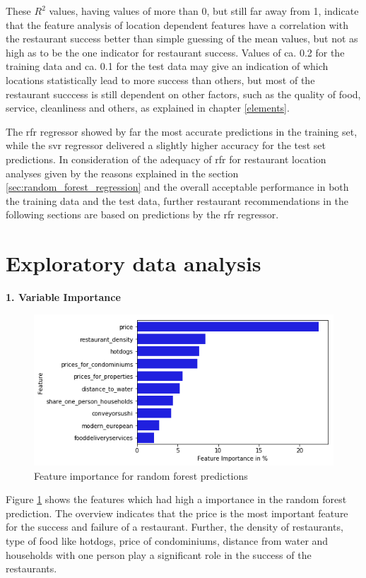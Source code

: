 \documentclass[a4paper, 11pt, oneside]{Thesis}  %
\begin{document}
These $R^2$ values, having values of more than 0, but still far away from 1, indicate that the feature analysis of location dependent features have a correlation with the restaurant success better than simple guessing of the mean values, but not as high as to be the one indicator for restaurant success. Values of ca. 0.2 for the training data and ca. 0.1 for the test data may give an indication of which locations statistically lead to more success than others, but most of the restaurant succcess is still dependent on other factors, such as the quality of food, service, cleanliness and others, as explained in chapter \ref{elements}.

The \ac{rfr} regressor showed by far the most accurate predictions in the training set, while the \ac{svr} regressor delivered a slightly higher accuracy for the test set predictions. In consideration of the adequacy of \ac{rfr} for restaurant location analyses given by the reasons explained in the section \ref{sec:random_forest_regression} and the overall acceptable performance in both the training data and the test data, further restaurant recommendations in the following sections are based on predictions by the \ac{rfr} regressor.

\section{Exploratory data analysis}

\textbf{1.	Variable Importance}

\begin{figure}[h]
\includegraphics[scale=0.7]{Figures/Exploratory/feature_importance_barplot.png}
\centering
\caption{Feature importance for random forest predictions}
\label{fig:feature_importance_barplot}
\end{figure}

Figure \ref{fig:feature_importance_barplot} shows the features which had high a importance in the random forest prediction. The overview indicates that the price is the most important feature for the success and failure of a restaurant. Further, the density of restaurants, type of food like hotdogs, price of condominiums, distance from water and households with one person play a significant role in the success of the restaurants.
\end{document}
